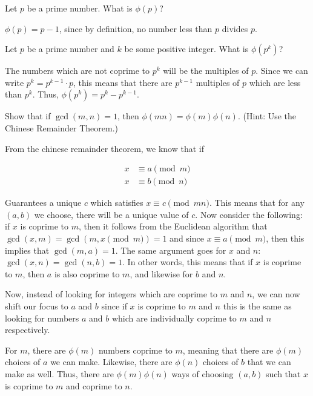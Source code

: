 \documentclass[11pt]{article}
\begin{document}
  \begin{Parts}
    \Part Let $p$ be a prime number. What is $\phi(p)$?

    \begin{solution}
      $\phi(p) = p-1$, since by definition, no number less than $p$ divides $p$.
    \end{solution}

    \Part Let $p$ be a prime number and $k$ be some positive integer. What is $\phi(p^k)$?

    \begin{solution}
      The numbers which are not coprime to $p^k$ will be the multiples of $p$. Since we can write $p^k = p^{k-1} \cdot p$, this means that there are $p^{k-1}$ multiples of $p$ which are less than $p^k$. Thus, $\phi(p^k) = p^k - p^{k-1}$.
      \end{solution}

    \Part Show that if $\gcd(m, n) = 1$, then $\phi(mn) = \phi(m)\phi(n)$. (Hint: Use the Chinese Remainder Theorem.)

    \begin{solution}
      From the chinese remainder theorem, we know that if 

      \begin{align*}
        x &\equiv a \pmod{m}\\
        x &\equiv b \pmod{n} 
      \end{align*}

      Guarantees a unique $c$ which satisfies $x \equiv c \pmod{mn}$. This means that for any $(a, b)$ we choose, there will be a unique value of $c$. Now consider the following: if $x$ is coprime to $m$, then it follows from the Euclidean algorithm that $\gcd(x, m) = \gcd(m, x \pmod m) = 1$ and since $x \equiv a \pmod m$, then this implies that $\gcd(m, a) = 1$. The same argument goes for $x$ and $n$: $\gcd(x, n) = \gcd(n, b) = 1$. In other words, this means that if $x$ is coprime to $m$, then $a$ is also coprime to $m$, and likewise for $b$ and $n$. 

      Now, instead of looking for integers which are coprime to $m$ and $n$, we can now shift our focus to $a$ and $b$ since if $x$ is coprime to $m$ and $n$ this is the same as looking for numbers $a$ and $b$ which are individually coprime to $m$ and $n$ respectively. 

      For $m$, there are $\phi(m)$ numbers coprime to $m$, meaning that there are $\phi(m)$ choices of $a$ we can make. Likewise, there are $\phi(n)$ choices of $b$ that we can make as well. Thus, there are $\phi(m)\phi(n)$ ways of choosing $(a, b)$ such that $x$ is coprime to $m$ and coprime to $n$. 
      

\end{solution}
\end{Parts}
\end{document}

